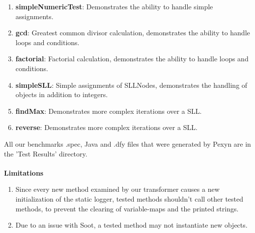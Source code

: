 \documentclass[10pt]{article}
\begin{document}
\begin{enumerate}
\item \textbf{simpleNumericTest}: Demonstrates the ability to handle simple assignments.
\item \textbf{gcd}: Greatest common divisor calculation, demonstrates the ability to
handle loops and conditions.
\item \textbf{factorial}: Factorial calculation, demonstrates the ability to handle loops and conditions.
\item \textbf{simpleSLL}: Simple assignments of SLLNodes, demonstrates the handling of objects in addition to integers.
\item \textbf{findMax}: Demonstrates more complex iterations over a SLL.
\item \textbf{reverse}: Demonstrates more complex iterations over a SLL.
\end{enumerate}    
All our benchmarks .spec, Java and .dfy files that were generated by Pexyn are in the 'Test Results' directory. \\\\

\textbf{Limitations}
\begin{enumerate}
\item Since every new method examined by our transformer causes a new initialization of the static logger, tested methods shouldn't call other tested methods, to prevent the clearing of variable-maps and the printed strings.
\item Due to an issue with Soot, a tested method may not instantiate new objects.
\end{enumerate}    

\begin{center}
\end{center}
\end{document}
